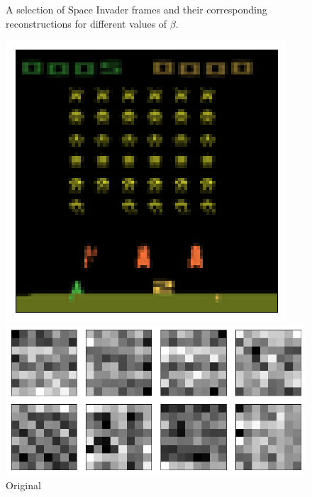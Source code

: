 \begin{figure}[h!]
\begin{multicols}{4}
    \caption{$\beta = 4$}
\end{multicols}
\caption{A selection of Space Invader frames and their corresponding reconstructions for different values of $\beta$.}
\label{fig:colour_separated_originals_and_reconstructions}
\end{figure}



\begin{figure}[h!]
\centering
\captionsetup{justification=centering}
\begin{minipage}{0.4\textwidth}
\centering
\captionsetup{justification=centering}
\includegraphics[scale=0.4]{figures/results/colour_separated/beta_1_sample_3_original.png}
\caption{Original}
\end{minipage}
\begin{minipage}{0.55\textwidth}
\centering
\captionsetup{justification=centering}
\includegraphics[scale=0.42]{figures/results/colour_separated/beta_1_convolutional_layers_sample_3.png}

\end{minipage}
\end{figure}
